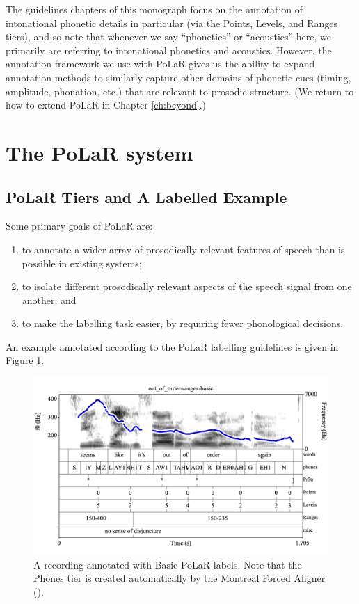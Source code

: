 \documentclass[11pt, twoside]{memoir}
\begin{document}
The guidelines chapters of this monograph focus on the annotation of intonational phonetic details in particular (via the Points, Levels, and Ranges tiers), and so note that whenever we say “phonetics” or “acoustics” here, we primarily are referring to intonational phonetics and acoustics.  However, the annotation framework we use with PoLaR gives us the ability to expand annotation methods to similarly capture other domains of phonetic cues (timing, amplitude, phonation, etc.) that are relevant to prosodic structure. (We return to how to extend PoLaR in Chapter \ref{ch:beyond}.)

\section{The PoLaR system}\label{sec:polar-system}

\subsection{PoLaR Tiers and A Labelled Example}\label{sec:polar-tiers-and-a-labelled-example}

Some primary goals of PoLaR are:

\begin{enumerate}
\item to annotate a wider array of prosodically relevant features of speech than is possible in existing systems;
\item to isolate different prosodically relevant aspects of the speech signal from one another; and
\item to make the labelling task easier, by requiring fewer phonological decisions.
\end{enumerate}

An example annotated according to the PoLaR labelling guidelines is given in Figure \ref{fig:PoLaR 1st basic}.

\begin{figure}[H]
\centering
%
\includegraphics[width=.875\linewidth]{out_of_order-ranges-basic--7.png}
%
\caption{A recording annotated with Basic PoLaR labels. Note that the Phones tier is created automatically by the Montreal Forced Aligner (\citealt{mcauliffe-19}).\protect\footnotemark%
\label{fig:PoLaR 1st basic}%
}
\end{figure}
\end{document}
